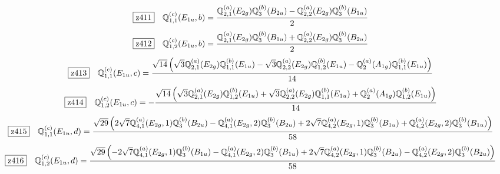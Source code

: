 \documentclass[fleqn,10pt,landscape]{jsarticle}
\begin{document}
\begin{dmath*}
\hspace*{3mm}\fbox{z411}\quad \mathbb{Q}_{1,1}^{(c)}(E_{1u},b)=\frac{\mathbb{Q}_{2,1}^{(a)}(E_{2g}) \mathbb{Q}_{3}^{(b)}(B_{2u}) - \mathbb{Q}_{2,2}^{(a)}(E_{2g}) \mathbb{Q}_{3}^{(b)}(B_{1u})}{2}
\end{dmath*}
\begin{dmath*}
\hspace*{3mm}\fbox{z412}\quad \mathbb{Q}_{1,2}^{(c)}(E_{1u},b)=\frac{\mathbb{Q}_{2,1}^{(a)}(E_{2g}) \mathbb{Q}_{3}^{(b)}(B_{1u}) + \mathbb{Q}_{2,2}^{(a)}(E_{2g}) \mathbb{Q}_{3}^{(b)}(B_{2u})}{2}
\end{dmath*}
\begin{dmath*}
\hspace*{3mm}\fbox{z413}\quad \mathbb{Q}_{1,1}^{(c)}(E_{1u},c)=\frac{\sqrt{14} \left(\sqrt{3} \mathbb{Q}_{2,1}^{(a)}(E_{2g}) \mathbb{Q}_{1,1}^{(b)}(E_{1u}) - \sqrt{3} \mathbb{Q}_{2,2}^{(a)}(E_{2g}) \mathbb{Q}_{1,2}^{(b)}(E_{1u}) - \mathbb{Q}_{2}^{(a)}(A_{1g}) \mathbb{Q}_{1,1}^{(b)}(E_{1u})\right)}{14}
\end{dmath*}
\begin{dmath*}
\hspace*{3mm}\fbox{z414}\quad \mathbb{Q}_{1,2}^{(c)}(E_{1u},c)=- \frac{\sqrt{14} \left(\sqrt{3} \mathbb{Q}_{2,1}^{(a)}(E_{2g}) \mathbb{Q}_{1,2}^{(b)}(E_{1u}) + \sqrt{3} \mathbb{Q}_{2,2}^{(a)}(E_{2g}) \mathbb{Q}_{1,1}^{(b)}(E_{1u}) + \mathbb{Q}_{2}^{(a)}(A_{1g}) \mathbb{Q}_{1,2}^{(b)}(E_{1u})\right)}{14}
\end{dmath*}
\begin{dmath*}
\hspace*{3mm}\fbox{z415}\quad \mathbb{Q}_{1,1}^{(c)}(E_{1u},d)=\frac{\sqrt{29} \left(2 \sqrt{7} \mathbb{Q}_{4,1}^{(a)}(E_{2g},1) \mathbb{Q}_{3}^{(b)}(B_{2u}) - \mathbb{Q}_{4,1}^{(a)}(E_{2g},2) \mathbb{Q}_{3}^{(b)}(B_{2u}) + 2 \sqrt{7} \mathbb{Q}_{4,2}^{(a)}(E_{2g},1) \mathbb{Q}_{3}^{(b)}(B_{1u}) + \mathbb{Q}_{4,2}^{(a)}(E_{2g},2) \mathbb{Q}_{3}^{(b)}(B_{1u})\right)}{58}
\end{dmath*}
\begin{dmath*}
\hspace*{3mm}\fbox{z416}\quad \mathbb{Q}_{1,2}^{(c)}(E_{1u},d)=\frac{\sqrt{29} \left(- 2 \sqrt{7} \mathbb{Q}_{4,1}^{(a)}(E_{2g},1) \mathbb{Q}_{3}^{(b)}(B_{1u}) - \mathbb{Q}_{4,1}^{(a)}(E_{2g},2) \mathbb{Q}_{3}^{(b)}(B_{1u}) + 2 \sqrt{7} \mathbb{Q}_{4,2}^{(a)}(E_{2g},1) \mathbb{Q}_{3}^{(b)}(B_{2u}) - \mathbb{Q}_{4,2}^{(a)}(E_{2g},2) \mathbb{Q}_{3}^{(b)}(B_{2u})\right)}{58}
\end{dmath*}
\end{document}
